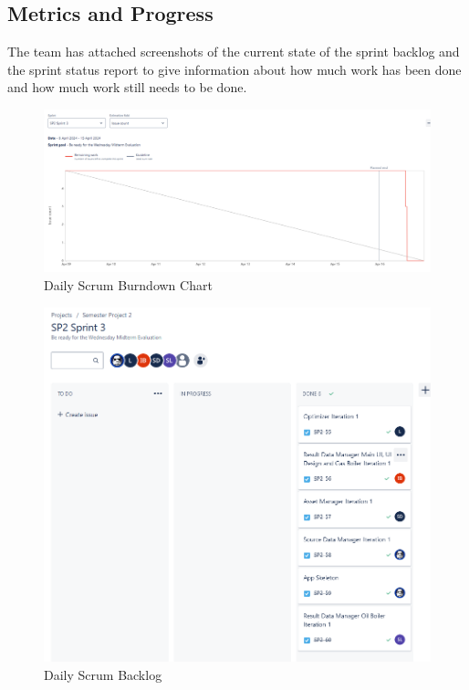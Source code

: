\documentclass[12pt]{report}
\begin{document}
\subsection*{Metrics and Progress}
The team has attached screenshots of the current state of the sprint backlog and the sprint status report to give information about how much work has been done and how much work still needs to be done.

\begin{figure}[H]
  \centering
  \includegraphics[width=1\textwidth]{Resources/3-Sprint/Daily-Scrum/burndownchart_sprint3.png}
  \caption{Daily Scrum Burndown Chart}
  \label{fig:S3Scrum2-image}
\end{figure}

\begin{figure}[H]
  \centering
  \includegraphics[width=1\textwidth]{Resources/3-Sprint/Daily-Scrum/backlog_sprint3.png}
  \caption{Daily Scrum Backlog}
  \label{fig:S3Scrum1-image}
\end{figure}
\end{document}
